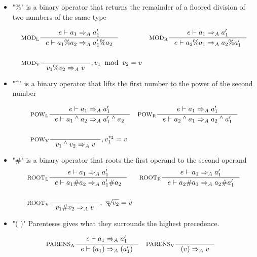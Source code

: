 \begin{itemize}
\item "\%" is a binary operator that returns the remainder of a floored division of two numbers of the same type

\begin{align*}
&\inference[$\text{MOD}_\text{L}$]{e \vdash a_1 \Rightarrow_A a_1'}
                    {e \vdash a_1 \% a_2 \Rightarrow_A a_1' \% a_2}
&
&\inference[$\text{MOD}_\text{R}$]{e \vdash a_1 \Rightarrow_A a_1'}
                    {e \vdash a_2 \% a_1 \Rightarrow_A a_2 \% a_1'}
\\\\
&\inference[$\text{MOD}_\text{V}$]{}
                    {v_1 \% v_2 \Rightarrow_A v}
                    {, v_1 \;\; \textrm{mod} \;\; v_2 = v}
\end{align*}

\item "\^{}" is a binary operator that lifts the first number to the power of the second number

\begin{align*}
&\inference[$\text{POW}_\text{L}$]{e \vdash a_1  \Rightarrow_A a_1'}
                    {e \vdash a_1 \Twedge a_2 \Rightarrow_A a_1' \Twedge a_2}
&
&\inference[$\text{POW}_\text{R}$]{e \vdash a_1 \Rightarrow_A a_1'}
                    {e \vdash a_2 \Twedge a_1 \Rightarrow_A a_2 \Twedge a_1'}
\\\\
&\inference[$\text{POW}_\text{V}$]{}
                    {v_1 \Twedge v_2 \Rightarrow_A v}
                    {, v_1 ^ {v_2} = v}
\end{align*}

\item "\#" is a binary operator that roots the first operand to the second operand
\begin{align*}
&\inference[$\text{ROOT}_\text{L}$]{e \vdash a_1 \Rightarrow_A a_1'}
                    {e \vdash a_1 \# a_2 \Rightarrow_A a_1' \# a_2}
&
&\inference[$\text{ROOT}_\text{R}$]{e \vdash a_1 \Rightarrow_A a_1'}
                    {e \vdash a_2 \# a_1 \Rightarrow_A a_2 \# a_1'}
\\\\
&\inference[$\text{ROOT}_\text{V}$]{}
                    {v_1 \# v_2 \Rightarrow_A v}
                    {, \sqrt[v_1]{v_2} = v}
\end{align*}

\item "( )" Parenteses gives what they surrounds the highest precedence.

\begin{align*}
&\inference[$\text{PARENS}_\text{A}$]{e \vdash a_1 \Rightarrow_A a_1'}
                       {e \vdash (a_1) \Rightarrow_A (a_1')}
&
&\inference[$\text{PARENS}_\text{V}$]{}
                       {(v) \Rightarrow_A v}
\end{align*}
\end{itemize}


